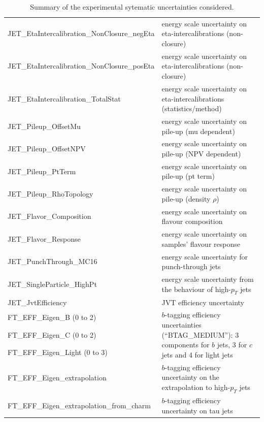 \begin{table}
{\begin{tabular}{l|l}
  JET\_EtaIntercalibration\_NonClosure\_negEta &  energy scale uncertainty on eta-intercalibrations (non-closure) \\
  JET\_EtaIntercalibration\_NonClosure\_posEta & energy scale uncertainty on eta-intercalibrations (non-closure) \\
  JET\_EtaIntercalibration\_TotalStat & energy scale uncertainty on eta-intercalibrations (statistics/method) \\
  JET\_Pileup\_OffsetMu                & energy scale uncertainty on pile-up (mu dependent)    \\
  JET\_Pileup\_OffsetNPV               & energy scale uncertainty on pile-up (NPV dependent)   \\
  JET\_Pileup\_PtTerm                  & energy scale uncertainty on pile-up (pt term)         \\
  JET\_Pileup\_RhoTopology             & energy scale uncertainty on pile-up (density $\rho$)  \\
  JET\_Flavor\_Composition             & energy scale uncertainty on flavour composition       \\
  JET\_Flavor\_Response                & energy scale uncertainty on samples' flavour response \\
  JET\_PunchThrough\_MC16              & energy scale uncertainty for punch-through jets       \\
  JET\_SingleParticle\_HighPt          & energy scale uncertainty from the behaviour of high-$p_T$ jets \\
  JET\_JvtEfficiency & JVT efficiency uncertainty      \\
  FT\_EFF\_Eigen\_B (0 to 2) & \multirow{3}{*}{\parbox{11cm}{$b$-tagging efficiency uncertainties (``BTAG\_MEDIUM''): 3 components for $b$ jets, 3 for $c$ jets and 4 for light jets}} \\
  FT\_EFF\_Eigen\_C (0 to 2)                 & \\
  FT\_EFF\_Eigen\_Light (0 to 3)             & \\
  FT\_EFF\_Eigen\_extrapolation              & $b$-tagging efficiency uncertainty on the extrapolation to high-$p_T$ jets\\
  FT\_EFF\_Eigen\_extrapolation\_from\_charm & $b$-tagging efficiency uncertainty on tau jets \\
\hline\hline     
\end{tabular}
}
\caption{Summary of the experimental sytematic uncertainties considered.}
\label{tab:expSyst}
\end{table}
